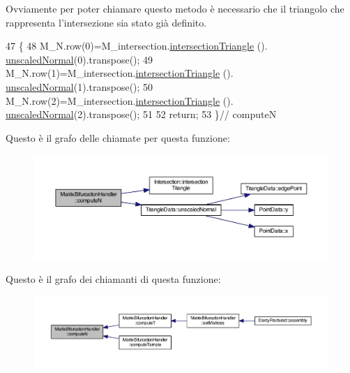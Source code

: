 Ovviamente per poter chiamare questo metodo è necessario che il triangolo che rappresenta l'intersezione sia stato già definito. 
\begin{DoxyCode}
47 \{
48     M\_N.row(0)=M\_intersection.\hyperlink{classIntersection_a603d1cb4b33762c72999968ceec95a39}{intersectionTriangle} ().
      \hyperlink{classTriangleData_a3b110e4ceb09cc5368fcecad9938a1c8}{unscaledNormal}(0).transpose();
49     M\_N.row(1)=M\_intersection.\hyperlink{classIntersection_a603d1cb4b33762c72999968ceec95a39}{intersectionTriangle} ().
      \hyperlink{classTriangleData_a3b110e4ceb09cc5368fcecad9938a1c8}{unscaledNormal}(1).transpose();
50     M\_N.row(2)=M\_intersection.\hyperlink{classIntersection_a603d1cb4b33762c72999968ceec95a39}{intersectionTriangle} ().
      \hyperlink{classTriangleData_a3b110e4ceb09cc5368fcecad9938a1c8}{unscaledNormal}(2).transpose();
51     
52     \textcolor{keywordflow}{return};
53 \}\textcolor{comment}{// computeN}
\end{DoxyCode}


Questo è il grafo delle chiamate per questa funzione\-:\nopagebreak
\begin{figure}[H]
\begin{center}
\leavevmode
\includegraphics[width=350pt]{classMatrixBifurcationHandler_ac134a5731e6614e543241a018ccf8c34_cgraph}
\end{center}
\end{figure}




Questo è il grafo dei chiamanti di questa funzione\-:\nopagebreak
\begin{figure}[H]
\begin{center}
\leavevmode
\includegraphics[width=350pt]{classMatrixBifurcationHandler_ac134a5731e6614e543241a018ccf8c34_icgraph}
\end{center}
\end{figure}


